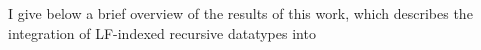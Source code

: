 \documentclass{article}
\begin{document}

I give below a brief overview of the results of this work, which
describes the integration of LF-indexed recursive datatypes into 
\end{document}
